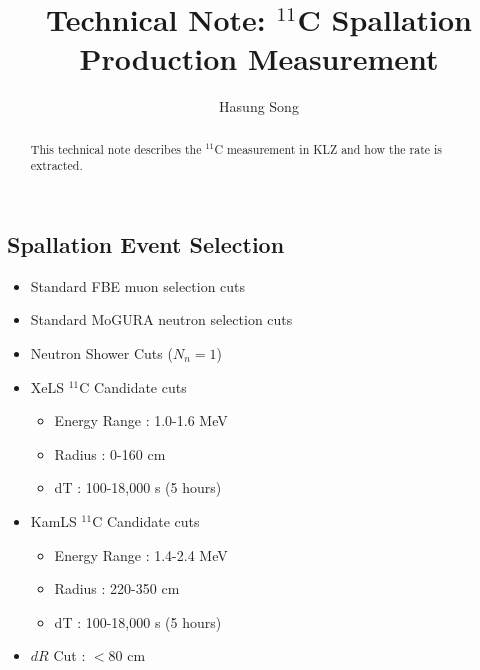 \documentclass[12pt,letterpaper]{article}
\begin{document}
\title{Technical Note: $^{11}$C Spallation Production Measurement}
\author{Hasung Song}
\maketitle
\begin{abstract}
	This technical note describes the $^{11}$C measurement in KLZ and how the rate is extracted.
\end{abstract}

\subsection*{Spallation Event Selection}
\begin{itemize}
	\item Standard FBE muon selection cuts
	\item Standard MoGURA neutron selection cuts
	\item Neutron Shower Cuts ($N_n=1$)
	\item XeLS $^{11}$C Candidate cuts
	\begin{itemize}
		\item Energy Range  : 1.0-1.6 MeV
		\item Radius : 0-160 cm
		\item dT : 100-18,000 s (5 hours)
	\end{itemize}
	\item KamLS $^{11}$C Candidate cuts
	\begin{itemize}
		\item Energy Range  : 1.4-2.4 MeV
		\item Radius : 220-350 cm
		\item dT : 100-18,000 s (5 hours)
	\end{itemize}
	\item $dR$ Cut : $<80$ cm
\end{itemize}
\end{document}
